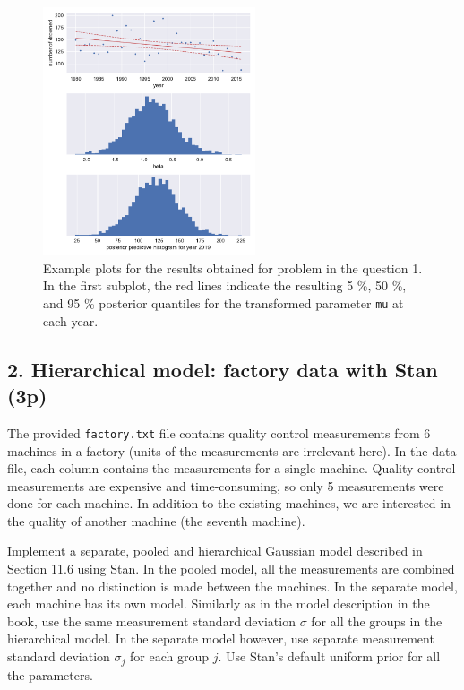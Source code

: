 \documentclass[a4paper,11pt]{article}
\begin{document}
\begin{figure}[htb!]
\centering
   \includegraphics[width=0.56\textwidth]{ex7_fig1.pdf}
\caption{Example plots for the results obtained for problem in the question 1. In the first subplot, the red lines indicate the resulting 5 \%, 50 \%, and 95 \% posterior quantiles for the transformed parameter {\tt mu} at each year.}\label{fig1}
\end{figure}


\subsection*{2. Hierarchical model: factory data with Stan (3p)}

The provided {\tt factory.txt} file contains quality control measurements from 6 machines in a factory (units of the measurements are irrelevant here). In the data file, each column contains the measurements for a single machine. Quality control measurements are expensive and time-consuming, so only 5 measurements were done for each machine. In addition to the existing machines, we are interested in the quality of another machine (the seventh machine).

Implement a separate, pooled and hierarchical Gaussian model described in Section 11.6 using Stan. In the pooled model, all the measurements are combined together and no distinction is made between the machines. In the separate model, each machine has its own model. Similarly as in the model description in the book, use the same measurement standard deviation $\sigma$ for all the groups in the hierarchical model. In the separate model however, use separate measurement standard deviation $\sigma_j$ for each group $j$. Use Stan's default uniform prior for all the parameters.
\end{document}
